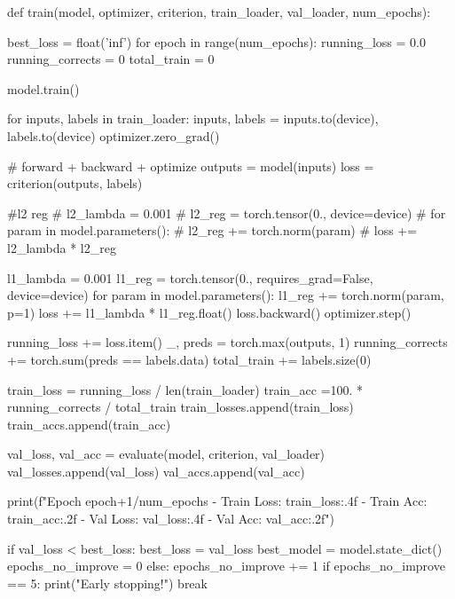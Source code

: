 \documentclass[11pt]{article}
\begin{document}
\begin{python}
def train(model, optimizer, criterion, train_loader, val_loader, num_epochs):

    best_loss = float('inf')
    for epoch in range(num_epochs):
        running_loss = 0.0
        running_corrects = 0
        total_train = 0
        
        model.train() 
        
        for inputs, labels in train_loader:
            inputs, labels = inputs.to(device), labels.to(device)
            optimizer.zero_grad() 
            
            # forward + backward + optimize
            outputs = model(inputs)
            loss = criterion(outputs, labels)
            
            #l2 reg
            # l2_lambda = 0.001
            # l2_reg = torch.tensor(0., device=device)
            # for param in model.parameters():
            #   l2_reg += torch.norm(param)
            # loss += l2_lambda * l2_reg
           
            l1_lambda = 0.001
            l1_reg = torch.tensor(0., requires_grad=False, device=device) 
            for param in model.parameters():
                l1_reg += torch.norm(param, p=1)
            loss += l1_lambda * l1_reg.float() 
            loss.backward()
            optimizer.step()
            
            running_loss += loss.item()
            _, preds = torch.max(outputs, 1)
            running_corrects += torch.sum(preds == labels.data)
            total_train += labels.size(0)
            
        train_loss = running_loss / len(train_loader)
        train_acc =100. * running_corrects / total_train
        train_losses.append(train_loss)
        train_accs.append(train_acc)
        
        
        val_loss, val_acc = evaluate(model, criterion, val_loader)
        val_losses.append(val_loss)
        val_accs.append(val_acc)
        
        
        print(f"Epoch {epoch+1}/{num_epochs} - Train Loss: {train_loss:.4f} - Train Acc: {train_acc:.2f} - Val Loss: {val_loss:.4f} - Val Acc: {val_acc:.2f}")
        
        
        if val_loss < best_loss:
            best_loss = val_loss
            best_model = model.state_dict()
            epochs_no_improve = 0
        else:
            epochs_no_improve += 1
            if epochs_no_improve == 5:
                print("Early stopping!")
                break



\end{python}
\end{document}
